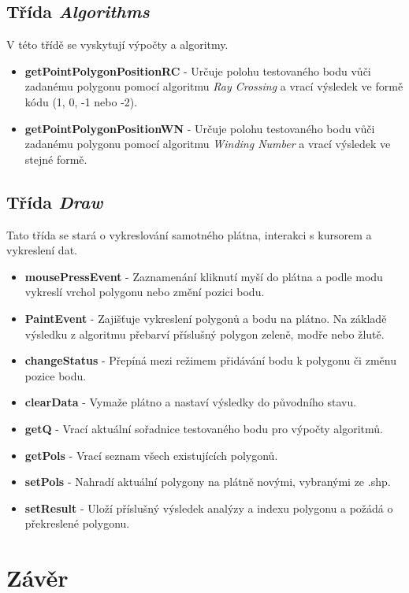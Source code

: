 \documentclass[12pt, a4paper]{article}
\begin{document}
\subsection{Třída \textit{Algorithms}}
V této třídě se vyskytují výpočty a algoritmy.

\begin{itemize}
  \item \textbf{getPointPolygonPositionRC} - Určuje polohu testovaného bodu vůči zadanému polygonu pomocí algoritmu \textit{Ray Crossing} a vrací výsledek ve formě kódu (1, 0, -1 nebo -2).
  \item \textbf{getPointPolygonPositionWN} - Určuje polohu testovaného bodu vůči zadanému polygonu pomocí algoritmu \textit{Winding Number} a vrací výsledek ve stejné formě.
\end{itemize}

\subsection{Třída \textit{Draw}}
Tato třída se stará o vykreslování samotného plátna, interakci s kursorem a vykreslení dat.

\begin{itemize}
  \item \textbf{mousePressEvent} - Zaznamenání kliknutí myší do plátna a podle modu vykreslí vrchol polygonu nebo změní pozici bodu.
  \item \textbf{PaintEvent} - Zajišťuje vykreslení polygonů a bodu na plátno. Na základě výsledku z algoritmu přebarví příslušný polygon zeleně, modře nebo žlutě.
  \item \textbf{changeStatus} - Přepíná mezi režimem přidávání bodu k polygonu či změnu pozice bodu.
  \item \textbf{clearData} - Vymaže plátno a nastaví výsledky do původního stavu.
  \item \textbf{getQ} - Vrací aktuální sořadnice testovaného bodu pro výpočty algoritmů.
  \item \textbf{getPols} - Vrací seznam všech existujících polygonů.
  \item \textbf{setPols} - Nahradí aktuální polygony na plátně novými, vybranými ze .shp.
  \item \textbf{setResult} - Uloží příslušný výsledek analýzy a indexu polygonu a požádá o překreslené polygonu.
\end{itemize}

\section{Závěr}
\end{document}
